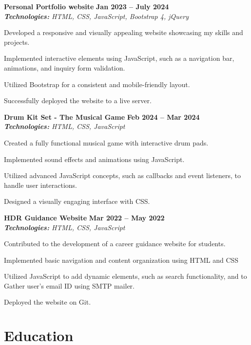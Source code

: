 \documentclass[letterpaper,10pt]{article}
\newcommand{\heading}[2]{
  \hspace{10pt}#1\hfill#2\\
}
\newcommand{\headingBf}[2]{
  \heading{\textbf{#1}}{\textbf{#2}}
}
\newcommand{\headingIt}[2]{
  \heading{\textit{#1}}{\textit{#2}}
}
\newenvironment{resume_list}{
  \vspace{-7pt}
  \begin{itemize}[itemsep=-2px, parsep=1pt, leftmargin=30pt]
}{
  \end{itemize}
}
\begin{document}
  \headingBf{Personal Portfolio website }{Jan 2023 -- July 2024}
  \headingIt{\textbf{Technologies:} HTML, CSS, JavaScript, Bootstrap 4, jQuery }{}
  \begin{resume_list}
    \item Developed a responsive and visually appealing website showcasing my skills and projects. 
    \item Implemented interactive elements using JavaScript, such as a navigation bar, animations, and inquiry form validation. 
    \item Utilized Bootstrap for a consistent and mobile-friendly layout. 
    \item Successfully deployed the website to a live server. 
    \vspace{3pt}
  \end{resume_list}

    \headingBf{Drum Kit Set - The Musical Game   }{Feb 2024 -- Mar 2024}
  \headingIt{\textbf{Technologies:} HTML, CSS, JavaScript }{}
  \begin{resume_list}
    \item Created a fully functional musical game with interactive drum pads. 
    \item Implemented sound effects and animations using JavaScript.  
    \item Utilized advanced JavaScript concepts, such as callbacks and event listeners, to handle user interactions. 
    \item Designed a visually engaging interface with CSS. 
  \end{resume_list}

    \headingBf{HDR Guidance Website }{Mar 2022 -- May 2022}
  \headingIt{\textbf{Technologies:} HTML, CSS, JavaScript }{}
  \begin{resume_list}
    \item Contributed to the development of a career guidance website for students. 
    \item Implemented basic navigation and content organization using HTML and CSS 
    \item Utilized JavaScript to add dynamic elements, such as search functionality, and to Gather user's email ID using SMTP mailer.
    \item Deployed the website on Git. 
  \end{resume_list}


  \section{Education}
\end{document}
